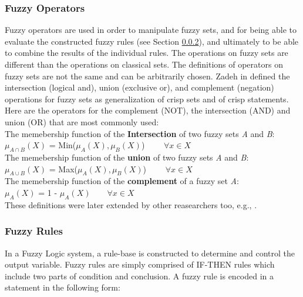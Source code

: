 \documentclass[11pt]{article}
\begin{document}
\subsubsection{Fuzzy Operators}

Fuzzy operators are used in order to manipulate fuzzy sets, and for being able
to evaluate the constructed fuzzy rules (see Section \ref{sec:fuzzy-rules}), and
ultimately to be able to combine the results of the individual rules. The
operations on fuzzy sets are different than the operations on classical sets.
The definitions of operators on fuzzy sets are not the same and can be
arbitrarily chosen. Zadeh in \cite{zadeh:fuzzy} defined the intersection
(logical and), union (exclusive or), and complement (negation) operations for
fuzzy sets as generalization of crisp sets and of crisp statements. Here are the
operators for the complement (NOT), the intersection (AND) and union (OR)
that are most commonly used:\\

\noindent The memebership function of the \textbf{Intersection} of two fuzzy
sets \textit{A} and \textit{B}:\\

$\mu_{A \cap B}(X)$ = Min($\mu_{A}(X), \mu_{B}(X)$) $\qquad \forall x \in X$\\

\noindent The memebership function of the \textbf{union} of two fuzzy sets
\textit{A} and \textit{B}:\\

$\mu_{A \cup B}(X)$ = Max($\mu_{A}(X), \mu_{B}(X)$) $\qquad \forall x \in X$\\

\noindent The memebership function of the \textbf{complement} of a fuzzy set
\textit{A}:\\

$\mu_{A}(X)$ = 1 - $\mu_{A}(X) \qquad \forall x \in X$\\

\noindent These definitions were later extended by other reasearchers too, e.g.,
\cite{yager:generalizing-leximin}.

\subsubsection{Fuzzy Rules}
\label{sec:fuzzy-rules}

In a Fuzzy Logic system, a rule-base is constructed to determine and control the
output variable. Fuzzy rules are simply comprised of IF-THEN rules which include
two parts of condition and conclusion. A fuzzy rule is encoded in a statement in
the following form:\\
\end{document}
